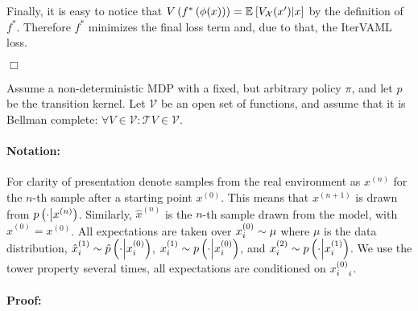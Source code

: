 Finally, it is easy to notice that $V\left( f^*\left( \phi(x) \right) \right) = \mathbb{E}_{}\left[  V_\mathcal{X}(x')\middle|x \right]$ by the definition of $f^*$.
Therefore $f^*$ minimizes the final loss term and, due to that, the IterVAML loss.

\hfill \ensuremath{\Box}


\begin{proposition}
    Assume a non-deterministic MDP with a fixed, but arbitrary policy $\pi$, and let $p$ be the transition kernel. 
    Let $\mathcal{V}$ be an open set of functions, and assume that it is Bellman complete: $\forall V \in \mathcal{V}: \mathcal{T}V \in \mathcal{V}$.
    
\end{proposition}

\paragraph{Notation:}

\newcommand{\target}{\roundb{\mathcal{T}V'}\roundb{\mx{1}}}

For clarity of presentation denote samples from the real environment as $x^{(n)}$ for the $n$-th sample after a starting point $x^{(0)}$. 
This means that $x^{(n+1)}$ is drawn from $p\left( \cdot\middle|x^{(n)} \right)$. Similarly, $\hat{x}^{(n)}$ is the $n$-th sample drawn from the model, with $\hat{x}^{(0)} = x^{(0)}$.
All expectations are taken over $x^{(0)}_i \sim \mu$ where $\mu$ is the data distribution, $\hat{x}^{(1)}_i \sim \hat{p}\left( \cdot\middle|x^{(0)}_i \right)$, $x^{(1)}_i \sim p\left( \cdot\middle|x^{(0)}_i \right)$, and $x^{(2)}_i \sim p\left( \cdot\middle|x^{(1)}_i \right)$.
We use the tower property several times, all expectations are conditioned on ${x^{(0)}_i}_i$.


\paragraph{Proof:}

